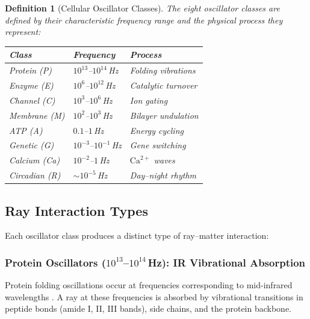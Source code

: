 \documentclass[11pt,twocolumn,a4paper]{article}
\newtheorem{definition}[theorem]{Definition}
\begin{document}
\begin{definition}[Cellular Oscillator Classes]
\label{def:oscillator-classes}
The eight oscillator classes are defined by their characteristic
frequency range and the physical process they represent:

\begin{center}
\small
\begin{tabularx}{\columnwidth}{@{}lll@{}}
\toprule
\textbf{Class} & \textbf{Frequency} & \textbf{Process} \\
\midrule
Protein (P) & $10^{13}$--$10^{14}$\,Hz & Folding vibrations \\
Enzyme (E) & $10^{6}$--$10^{12}$\,Hz & Catalytic turnover \\
Channel (C) & $10^{3}$--$10^{6}$\,Hz & Ion gating \\
Membrane (M) & $10^{2}$--$10^{3}$\,Hz & Bilayer undulation \\
ATP (A) & $0.1$--$1$\,Hz & Energy cycling \\
Genetic (G) & $10^{-3}$--$10^{-1}$\,Hz & Gene switching \\
Calcium (Ca) & $10^{-2}$--$1$\,Hz & $\text{Ca}^{2+}$ waves \\
Circadian (R) & $\sim\!10^{-5}$\,Hz & Day--night rhythm \\
\bottomrule
\end{tabularx}
\end{center}
\end{definition}

\subsection{Ray Interaction Types}

Each oscillator class produces a distinct type of ray--matter
interaction:

\subsubsection{Protein Oscillators ($10^{13}$--$10^{14}$\,Hz):
IR Vibrational Absorption}

Protein folding oscillations occur at frequencies corresponding to
mid-infrared wavelengths \citep{anfinsen1973}. A ray at these
frequencies is absorbed by vibrational transitions in peptide bonds
(amide I, II, III bands), side chains, and the protein backbone.
\end{document}
